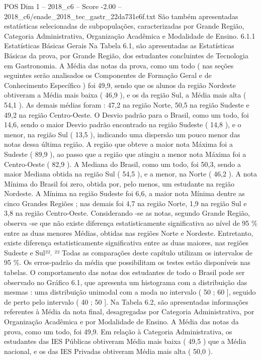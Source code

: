 \begin{textsample}{POS Dim 1 – 2018\_c6 – Score -2.00 – 2018\_c6/enade\_2018\_tec\_gastr\_22da731e6f.txt}
São também apresentadas estatísticas selecionadas de subpopulações, caracterizadas por Grande Região, Categoria Administrativa, Organização Acadêmica e Modalidade de Ensino. 6.1.1 Estatísticas Básicas Gerais Na Tabela 6.1, são apresentadas as Estatísticas Básicas da prova, por Grande Região, dos estudantes concluintes de Tecnologia em Gastronomia.
A Média das notas da prova, como um todo ( nas seções seguintes serão analisados os Componentes de Formação Geral e de Conhecimento Específico ) foi 49,9, sendo que os alunos da região Nordeste obtiveram a Média mais baixa ( 46,9 ), e os da região Sul, a Média mais alta ( 54,1 ).
As demais médias foram : 47,2 na região Norte, 50,5 na região Sudeste e 49,2 na região Centro-Oeste.
O Desvio padrão para o Brasil, como um todo, foi 14,6, sendo o maior Desvio padrão encontrado na região Sudeste ( 14,8 ), e o menor, na região Sul ( 13,5 ), indicando uma dispersão um pouco menor das notas dessa última região.
A região que obteve a maior nota Máxima foi a Sudeste ( 89,9 ), ao passo que a região que atingiu a menor nota Máxima foi a Centro-Oeste ( 82,9 ).
A Mediana do Brasil, como um todo, foi 50,3, sendo a maior Mediana obtida na região Sul ( 54,5 ), e a menor, na Norte ( 46,2 ).
A nota Mínima do Brasil foi zero, obtida por, pelo menos, um estudante na região Nordeste.
A Mínima na região Sudeste foi 6,6, a maior nota Mínima dentre as cinco Grandes Regiões ; nas demais foi 4,7 na região Norte, 1,9 na região Sul e 3,8 na região Centro-Oeste.
Considerando -se as notas, segundo Grande Região, observa -se que não existe diferença estatisticamente significativa ao nível de 95 \% entre as duas menores Médias, obtidas nas regiões Norte e Nordeste.
Entretanto, existe diferença estatisticamente significativa entre as duas maiores, nas regiões Sudeste e Sul²². ²² Todas as comparações deste capítulo utilizam os intervalos de 95 \%.
Os erros-padrão da média que possibilitam os testes estão disponíveis nas tabelas.
O comportamento das notas dos estudantes de todo o Brasil pode ser observado no Gráfico 6.1, que apresenta um histograma com a distribuição das mesmas : uma distribuição unimodal com a moda no intervalo ( 50 ; 60 ], seguido de perto pelo intervalo ( 40 ; 50 ].
Na Tabela 6.2, são apresentadas informações referentes à Média da nota final, desagregadas por Categoria Administrativa, por Organização Acadêmica e por Modalidade de Ensino.
A Média das notas da prova, como um todo, foi 49,9.
Em relação à Categoria Administrativa, os estudantes das IES Públicas obtiveram Média mais baixa ( 49,5 ) que a Média nacional, e os das IES Privadas obtiveram Média mais alta ( 50,0 ).

\end{textsample}
